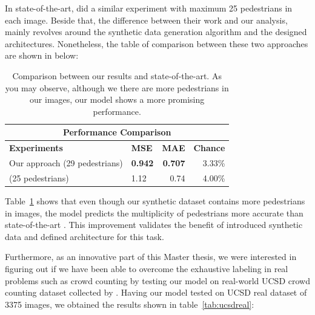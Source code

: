 \noindent In state-of-the-art, \citet{segui2015learning} did a similar experiment with maximum 25 pedestrians in each image. Beside that, the difference between their work and our analysis, mainly revolves around the synthetic data generation algorithm and the designed architectures. Nonetheless, the table of comparison between these two approaches are shown in below:
 
\begin{table}[H]
\centering
\small\sffamily
\begin{tabular}{llrr}
\multicolumn{4}{c}{\textbf{\textbf{Performance Comparison}}} \\
\bottomrule
\textbf{Experiments} &\textbf{MSE} &\textbf{MAE}& \textbf{Chance} \\
\bottomrule
Our approach (29 pedestrians)                  & \textbf{0.942}   &  \textbf{0.707}        & 3.33\% \\
\citet{segui2015learning} (25 pedestrians)     & 1.12       & 0.74     & 4.00\% \\
\bottomrule
\end{tabular}
\caption{Comparison between our results and state-of-the-art. As you may observe, although we there are more pedestrians in our images, our model shows a more promising performance.  }
\label{tab:tab}
\end{table} 

Table~\ref{tab:tab} shows that even though our synthetic dataset contains more pedestrians in images, the model predicts the multiplicity of pedestrians more accurate than state-of-the-art \cite{segui2015learning}. This improvement validates the benefit of introduced synthetic data and defined architecture for this task. 

\noindent Furthermore, as an innovative part of this Master thesis, we were interested in figuring out if we have been able to overcome the exhaustive labeling in real problems such as crowd counting by testing our model on real-world UCSD crowd counting dataset collected by \citet{chan2008privacy}. Having our model tested on UCSD real dataset of 3375 images, we obtained the results shown in table~\ref{tab:ucsdreal}:

%
%
%

